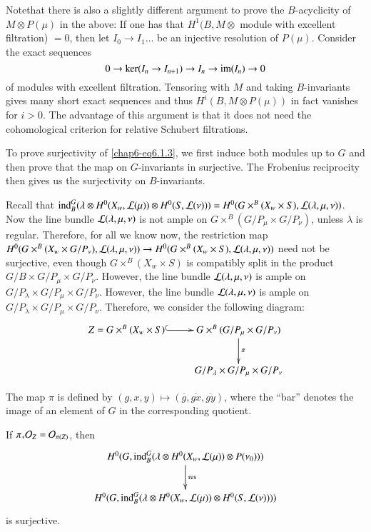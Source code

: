 \begin{remark}\label{chap6-rem6.1.4}
Note\pageoriginale that\label{page58} there is also a slightly different argument to
prove the $B$-acyclicity of $M\otimes P(\mu)$ in the above: If one has
that $H^{1}(B,M\otimes$ module with excellent filtration) $=0$, then
let $I_{0}\to I_{1}\ldots$ be an injective resolution of
$P(\mu)$. Consider the exact sequences
$$
0\to \ker(I_{n}\to I_{n+1})\to I_{n}\to \operatorname{im}(I_{n})\to 0
$$
of modules with excellent filtration. Tensoring with $M$ and taking
$B$-invariants gives many short exact sequences and thus
$H^{i}(B,M\otimes P(\mu))$ in fact vanishes for $i>0$. The advantage
of this argument is that it does not need the cohomological criterion
for relative Schubert filtrations.
\end{remark}

To prove surjectivity of \eqref{chap6-eq6.1.3}, we first induce both
modules up to $G$ and then prove that the map on $G$-invariants in
surjective. The Frobenius reciprocity then gives us the surjectivity
on $B$-invariants.

Recall that $\operatorname{ind}^{G}_{B}(\lambda\otimes H^{0}(X_{w},\mathcal{L}(\mu))\otimes
H^{0}(S,\mathcal{L}(\nu)))=H^{0}(G\times^{B}(X_{w}\times S),
\mathcal{L}(\lambda,\mu,\nu))$. Now the line bundle $\mathcal{L}(\lambda,\mu,\nu)$ is
not ample on $G\times^{B}(G/P_{\mu}\times G/P_{\nu})$, unless
$\lambda$ is regular. Therefore, for all we know now, the restriction
map $H^{0}(G\times^{B}(X_{w}\times G/P_{\nu}),\mathcal{L}(\lambda,\mu,\nu))\to
H^{0}(G\times^{B}(X_{w}\times S),\mathcal{L}(\lambda,\mu,\nu))$ need not be
surjective, even though $G\times^{B}(X_{w}\times S)$ is compatibly
split in the product $G/B\times G/P_{\mu}\times G/P_{\nu}$. However,
the line bundle $\mathcal{L}(\lambda,\mu,\nu)$ is ample on $G/P_{\lambda}\times
G/P_{\mu}\times G/P_{\nu}$. However, the line bundle
$\mathcal{L}(\lambda,\mu,\nu)$ is ample on $G/P_{\lambda}\times G/P_{\mu}\times
G/P_{\nu}$. Therefore, we consider the following diagram:
\[
\xymatrix{
Z=G\times^{B}(X_{w}\times S)\ar@{^(->}[r] &
G\times^{B}(G/P_{\mu}\times G/P_{\nu})\ar[d]^{\pi}\\
 & G/P_{\lambda}\times G/P_{\mu}\times G/P_{\nu}
}
\]

The map $\pi$ is defined by $(g,x,y)\mapsto
(\overline{g},\overline{gx},\overline{gy})$, where the ``bar'' denotes
the image of an element of $G$ in the corresponding quotient.

\setcounter{theorem}{4}
\begin{lemma}\label{chap6-lem6.1.5}
If $\pi_{\ast}\mathcal{O}_{Z}=\mathcal{O}_{\pi(Z)}$, then
\[
\xymatrix{
H^{0}(G,\ind^{G}_{B}(\lambda\otimes H^{0}(X_{w},\L(\mu))\otimes
P(\nu_{0})))\ar[d]^{\res}\\
H^{0}(G,\ind^{G}_{B}(\lambda\otimes H^{0}(X_{w},\L(\mu))\otimes
H^{0}(S,\L(\nu)))) 
}
\]
is surjective. 
\end{lemma}

